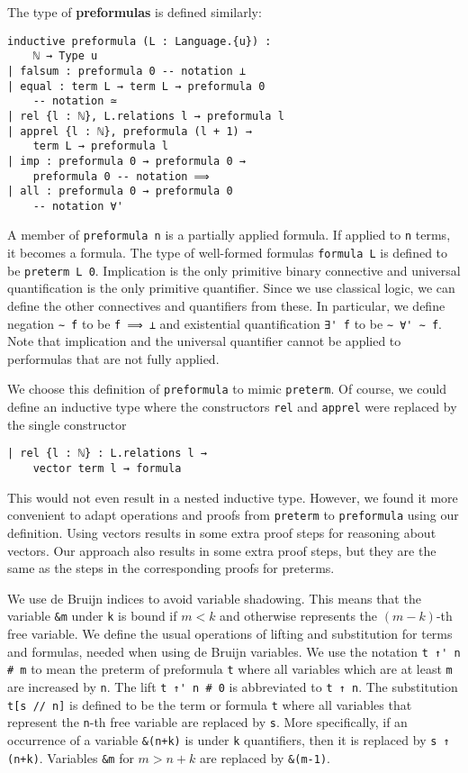 \documentclass[sigplan,10pt,review, anonymous]{acmart}
\newcommand{\lil}{\lstinline}
\theoremstyle{definition}
\begin{document}
The type of \textbf{preformulas} is defined similarly:
\begin{lstlisting}
inductive preformula (L : Language.{u}) :
    ℕ → Type u
| falsum : preformula 0 -- notation ⊥
| equal : term L → term L → preformula 0
    -- notation ≃
| rel {l : ℕ}, L.relations l → preformula l
| apprel {l : ℕ}, preformula (l + 1) →
    term L → preformula l
| imp : preformula 0 → preformula 0 →
    preformula 0 -- notation ⟹
| all : preformula 0 → preformula 0
    -- notation ∀'
\end{lstlisting}
A member of \lil{preformula n} is a partially applied formula.
If applied to \lil{n} terms, it becomes a formula.
The type of well-formed formulas \lil{formula L} is defined to be \lil{preterm L 0}.
Implication is the only primitive binary connective and universal quantification is the only primitive quantifier. Since we use classical logic, we can define the other connectives and quantifiers from these.
In particular, we define negation \lil{∼ f} to be \lil{f ⟹ ⊥} and existential quantification \lil{∃' f} to be \lil{∼ ∀' ∼ f}.
Note that implication and the universal quantifier cannot be applied to performulas that are not fully applied.

We choose this definition of \lil{preformula} to mimic \lil{preterm}.
Of course, we could define an inductive type where the constructors \lil{rel} and \lil{apprel} were replaced by the single constructor
\begin{lstlisting}
| rel {l : ℕ} : L.relations l →
    vector term l → formula
\end{lstlisting}
This would not even result in a nested inductive type.
However, we found it more convenient to adapt operations and proofs from \lil{preterm} to \lil{preformula} using our definition.
Using vectors results in some extra proof steps for reasoning about vectors.
Our approach also results in some extra proof steps, but they are the same as the steps in the corresponding proofs for preterms.

We use de Bruijn indices to avoid variable shadowing. This means that the variable \lil{&m} under \lil{k} is bound if $m<k$ and otherwise represents the $(m-k)$-th free variable.
We define the usual operations of lifting and substitution for terms and formulas, needed when using de Bruijn variables.
We use the notation \lil{t ↑' n # m} to mean the preterm of preformula \lil{t} where all variables which are at least \lil{m} are increased by \lil{n}.
The lift \lil{t ↑' n # 0} is abbreviated to \lil{t ↑ n}.
The substitution \lil{t[s // n]} is defined to be the term or formula \lil{t} where all variables that represent the \lil{n}-th free variable are replaced by \lil{s}.
More specifically, if an occurrence of a variable \lil{&(n+k)} is under \lil{k} quantifiers, then it is replaced by \lil{s ↑ (n+k)}.
Variables \lil{&m} for $m>n+k$ are replaced by \lil{&(m-1)}.
\end{document}
